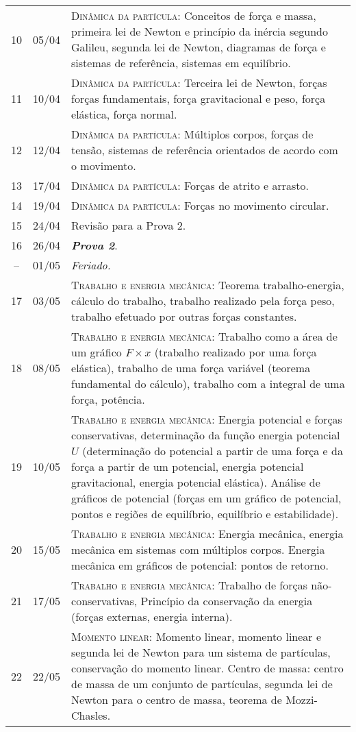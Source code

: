 \begin{center}
\begin{longtable}{ccp{70mm}}
10	 & 	05/04	 & 	\textsc{Dinâmica da partícula:} Conceitos de força e massa, primeira lei de Newton e princípio da inércia segundo Galileu, segunda lei de Newton, diagramas de força e sistemas de referência, sistemas em equilíbrio. \\
11	 & 	10/04	 & 	\textsc{Dinâmica da partícula:} Terceira lei de Newton, forças forças fundamentais, força gravitacional e peso, força elástica, força normal. \\
12	 & 	12/04	 & 	\textsc{Dinâmica da partícula:} Múltiplos corpos, forças de tensão, sistemas de referência orientados de acordo com o movimento. \\
13	 & 	17/04	 & 	\textsc{Dinâmica da partícula:} Forças de atrito e arrasto. \\
14	 & 	19/04	 & 	\textsc{Dinâmica da partícula:} Forças no movimento circular. \\
15	 & 	24/04	 & 	Revisão para a Prova 2. \\
16	 & 	26/04	 & 	\textbf{\textit{Prova 2}}. \\
--   &  01/05    &  \emph{Feriado.} \\
17	 & 	03/05	 & 	\textsc{Trabalho e energia mecânica:} Teorema trabalho-energia, cálculo do trabalho, trabalho realizado pela força peso, trabalho efetuado por outras forças constantes. \\
18	 & 	08/05	 & 	\textsc{Trabalho e energia mecânica:} Trabalho como a área de um gráfico $F \times x$ (trabalho realizado por uma força elástica), trabalho de uma força variável (teorema fundamental do cálculo), trabalho com a integral de uma força, potência. \\
19	 & 	10/05	 & 	\textsc{Trabalho e energia mecânica:} Energia potencial e forças conservativas, determinação da função energia potencial $U$ (determinação do potencial a partir de uma força e da força a partir de um potencial, energia potencial gravitacional, energia potencial elástica). Análise de gráficos de potencial (forças em um gráfico de potencial, pontos e regiões de equilíbrio, equilíbrio e estabilidade). \\
20	 & 	15/05	 & 	\textsc{Trabalho e energia mecânica:} Energia mecânica, energia mecânica em sistemas com múltiplos corpos. Energia mecânica em gráficos de potencial: pontos de retorno. \\
21	 & 	17/05	 & 	\textsc{Trabalho e energia mecânica:} Trabalho de forças não-conservativas, Princípio da conservação da energia (forças externas, energia interna). \\
22	 & 	22/05	 & 	\textsc{Momento linear:} Momento linear, momento linear e segunda lei de Newton para um sistema de partículas, conservação do momento linear. Centro de massa: centro de massa de um conjunto de partículas, segunda lei de Newton para o centro de massa, teorema de Mozzi-Chasles. \\

\end{longtable}
\end{center}
